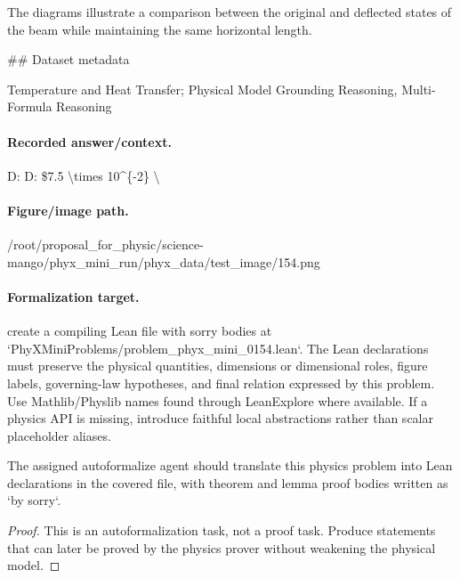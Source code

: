 The diagrams illustrate a comparison between the original and deflected states of the beam while maintaining the same horizontal length.

\#\# Dataset metadata

Temperature and Heat Transfer; Physical Model Grounding Reasoning, Multi-Formula Reasoning

\paragraph{Recorded answer/context.}
D: D: \$7.5 \textbackslash{}times 10\textasciicircum{}\{-2\} \textbackslash{}

\paragraph{Figure/image path.}
/root/proposal\_for\_physic/science-mango/phyx\_mini\_run/phyx\_data/test\_image/154.png

\paragraph{Formalization target.}
create a compiling Lean file with sorry bodies at `PhyXMiniProblems/problem\_phyx\_mini\_0154.lean`. The Lean declarations must preserve the physical quantities, dimensions or dimensional roles, figure labels, governing-law hypotheses, and final relation expressed by this problem.
Use Mathlib/Physlib names found through LeanExplore where available. If a physics API is missing, introduce faithful local abstractions rather than scalar placeholder aliases.

\begin{theorem}
\label{thm:physics:phyx_mini_0154:target}
The assigned autoformalize agent should translate this physics problem into Lean declarations in the covered file, with theorem and lemma proof bodies written as `by sorry`.
\end{theorem}
\begin{proof}
This is an autoformalization task, not a proof task. Produce statements that can later be proved by the physics prover without weakening the physical model.
\end{proof}

